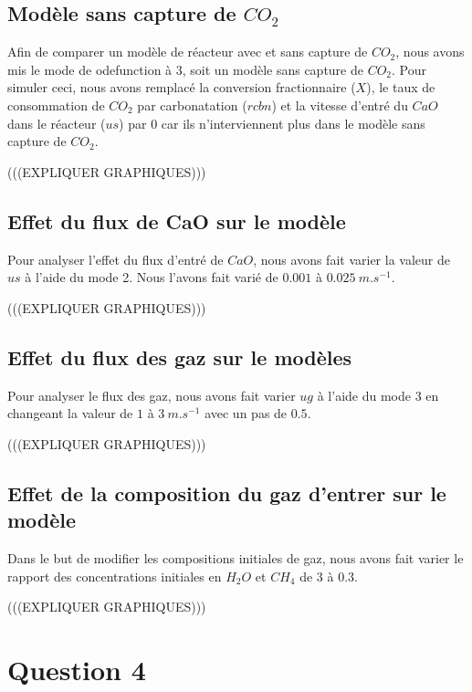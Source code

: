 \documentclass[11pt]{report}
\newcommand{\mychapter}[2]{
    \setcounter{chapter}{#1}
    \setcounter{section}{0}
    \chapter*{#2}
    \addcontentsline{toc}{chapter}{#2}
}
\begin{document}
        \section{Modèle sans capture de $CO_2$}
            Afin de comparer un modèle de réacteur avec et sans capture de $CO_2$,
            nous avons mis le mode de odefunction à 3, soit un modèle sans capture de $CO_2$.
            Pour simuler ceci, nous avons remplacé la conversion fractionnaire ($X$),
            le taux de consommation de $CO_2$ par carbonatation ($rcbn$)
            et la vitesse d'entré du $CaO$ dans le réacteur ($us$)
            par $0$ car ils n'interviennent plus dans le modèle sans capture de $CO_2$.
            \par
            (((EXPLIQUER GRAPHIQUES)))

        \section{Effet du flux de CaO sur le modèle}
            Pour analyser l'effet du flux d'entré de $CaO$,
            nous avons fait varier la valeur de $us$ à l'aide du mode 2.
            Nous l'avons fait varié de $0.001$ à $0.025\ m.s^{-1}$.
            \par
            (((EXPLIQUER GRAPHIQUES)))
        
        \section{Effet du flux des gaz sur le modèles}
            Pour analyser le flux des gaz, nous avons fait varier $ug$ à l'aide du mode 3
            en changeant la valeur de $1$ à $3\ m.s^{-1}$ avec un pas de $0.5$.
            \par
            (((EXPLIQUER GRAPHIQUES)))
        
        \section{Effet de la composition du gaz d'entrer sur le modèle}
            Dans le but de modifier les compositions initiales de gaz,
            nous avons fait varier le rapport des concentrations initiales en $H_2O$ et $CH_4$ de $3$ à $0.3$.
            \par
            (((EXPLIQUER GRAPHIQUES)))

    \mychapter{4}{Question 4}
\end{document}
